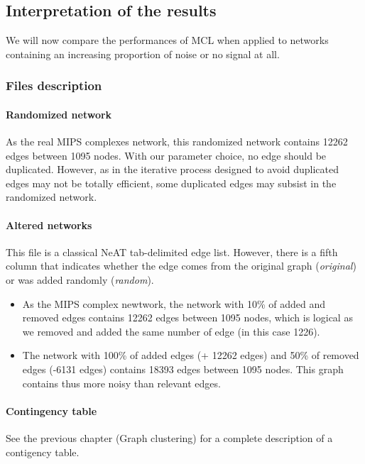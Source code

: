 \subsection{Interpretation of the results}

We will now compare the performances of MCL when applied to networks containing an increasing proportion of noise or no signal at all.

\subsubsection{Files description}

\paragraph{Randomized network}
As the real MIPS complexes network, this randomized network contains 12262 edges between 1095 nodes. With our parameter choice, no edge should be duplicated. However, as in  the iterative process designed to avoid duplicated edges may not be totally efficient, some duplicated edges may subsist in the randomized network. 

\paragraph{Altered networks}
  This file is a classical NeAT tab-delimited edge list. However, there is a fifth column that indicates
  whether the edge comes from the original graph (\textit{original}) or was added randomly (\textit{random}).
\begin{itemize}
 \item As the MIPS complex newtwork, the network with 10\% of added and removed edges contains 12262 edges between 1095 nodes, which is logical as we removed and added the same number of edge (in this case 1226).
 \item The network with 100\% of added edges (+ 12262 edges) and 50\% of removed edges (-6131 edges) contains 18393 edges between 1095 nodes. This graph contains thus more noisy than relevant edges.
\end{itemize}


\paragraph{Contingency table}

See the previous chapter (Graph clustering) for a complete description of a contigency table.

